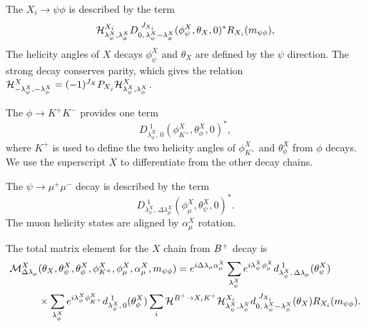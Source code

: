 The $X_i \to \psi \phi$ is described by the term 
\begin{equation}
{\cal H}_{\lambda_\psi^{X},\lambda_\phi^X}^{X_{i}}D^{\,\,J_{X_i}}_{0,\,\lambda_\psi^{X}-\lambda_\phi^X}(\phi_\psi^X,\theta_{X},0)^*R_{X_i}(m_{\psi \phi}),
\end{equation}
The helicity angles of $X$ decays $\phi_\psi^X$ and $\theta_{X}$ are defined by the $\psi$ direction. 
The strong decay conserves parity, which gives the relation ${\cal H}_{-\lambda_\psi^{X},-\lambda_\phi^{X}}^{X}=(-1)^{J_{X}}P_{X_j}{\cal H}_{\lambda_\psi^{X},\lambda_\phi^{X}}^{X}$.

The $\phi\to K^+K^-$ provides one term 
\begin{equation}
D^{\,\,1}_{\lambda^X_{\phi},\,0}(\phi^X_{K^+},\theta^X_\phi,0)^*,
\end{equation}
where $K^+$ is used to define the two helicity angles of $\phi^X_{K^+}$ and $\theta^X_\phi$ from $\phi$ decays. 
We use the superscript $X$ to differentiate from the other decay chains. 

The $\psi\to\mu^+\mu^-$ decay is described by the term
\begin{equation}
D^{\,\,1}_{\lambda^{X}_{\psi},\,\Delta\lambda^{X}_\mu}(
\phi_{\mu}^{X},\theta_{\psi}^{X},0)^*.
\end{equation}
The muon helicity states are aligned by $\alpha^X_\mu$ rotation.

The total matrix element for the $X$ chain from ${{{B}^+}}$ decay is 
\begin{align}
{\mathcal{M}}^X_{\Delta\lambda_\mu}&(\theta_{X},\theta_\psi^{X},\theta_\phi^X, \phi_{K^+}^X,\phi_\mu^{X},\alpha^{X}_\mu,m_{\psi\phi})=e^{i\Delta\lambda_\mu\alpha^{X}_{\mu}} \sum\limits_{\lambda_\psi^{X}}e^{i \lambda^{X}_{\psi} \phi_{\mu}^{X}}d^{\,\,1}_{\lambda^{X}_{\psi},\,\Delta\lambda_\mu}(\theta_{\psi}^{X})  \notag\\
&\times \sum\limits_{\lambda^X_{\phi}}e^{i\lambda^X_{\phi} \phi^X_{K^+}} d^{\,\,1}_{\lambda^X_{\phi},\,0}(\theta^X_\phi) 
\sum\limits_{i}{\cal H}^{{{{B}^+}}\rightarrow X_i {{K}^+}}{\cal H}_{\lambda_\psi^{X},\lambda_\phi^X}^{X_{i}} d^{\,\,J_{X_i}}_{0,\,\lambda_\psi^{X}-\lambda_\phi^X}(\theta_{X})R_{X_i}(m_{\psi \phi}).
\end{align}

